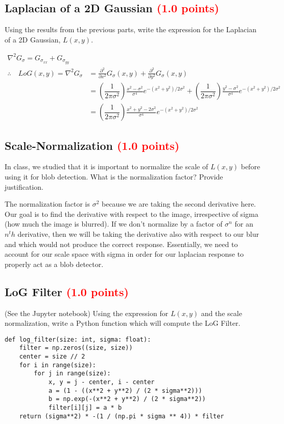 \documentclass[answers]{exam}
\newcommand{\mypoints}[1]{\textcolor{red}{(#1 points)}}
\begin{document}
\subsection{Laplacian of a 2D Gaussian \mypoints{1.0}}
Using the results from the previous parts, write the expression for the Laplacian of a 2D Gaussian, $L(x,y)$.
\begin{solution}
    $$
    \begin{aligned}
    \nabla^{2} G_{\sigma}=G_{\sigma_{xx}}+G_{\sigma_{yy}}\\
    \therefore \quad LoG(x, y)=\nabla^{2} G_{\sigma}&=\frac{\partial^{2}}{\partial x^{2}} G_{\sigma}(x, y)+\frac{\partial^{2}}{\partial y^{2}} G_{\sigma}(x, y) \\
    &=(\dfrac{1}{2\pi \sigma^2})\frac{x^{2}-\sigma^{2}}{\sigma^{4}} e^{-\left(x^{2}+y^{2}\right) / 2 \sigma^{2}}+(\dfrac{1}{2\pi \sigma^2})\frac{y^{2}-\sigma^{2}}{\sigma^{4}} e^{-\left(x^{2}+y^{2}\right) / 2 \sigma^{2}} \\
    &=(\dfrac{1}{2\pi \sigma^2})\frac{x^{2}+y^{2}-2 \sigma^{2}}{\sigma^{4}} e^{-\left(x^{2}+y^{2}\right) / 2 \sigma^{2}}
\end{aligned}
    $$
\end{solution}

\subsection{Scale-Normalization \mypoints{1.0}}
In class, we studied that it is important to normalize the scale of $L(x,y)$ before using it for blob detection. What is the normalization factor? Provide justification.
\begin{solution}
The normalization factor is $\sigma^2$ because we are taking the second derivative here. Our goal is to find the derivative with respect to the image, 
irrespective of sigma (how much the image is blurred). If we don't normalize by a factor of $\sigma^n$ for an $n^th$ derivative, then we will be taking 
the derivative also with respect to our blur and which would not produce the correct response. Essentially, we need to account for our scale space with sigma in order for our laplacian response to properly act as a blob detector.
\end{solution}

\subsection{LoG Filter \mypoints{1.0}}
(See the Jupyter notebook) Using the expression for $L(x,y)$ and the scale normalization, write a Python function which will compute the LoG Filter.
\begin{solution}
\begin{verbatim}
def log_filter(size: int, sigma: float):
    filter = np.zeros((size, size))
    center = size // 2
    for i in range(size):
        for j in range(size):
            x, y = j - center, i - center
            a = (1 - ((x**2 + y**2) / (2 * sigma**2)))
            b = np.exp(-(x**2 + y**2) / (2 * sigma**2))
            filter[i][j] = a * b
    return (sigma**2) * -(1 / (np.pi * sigma ** 4)) * filter
\end{verbatim}
\end{solution}
\end{document}
